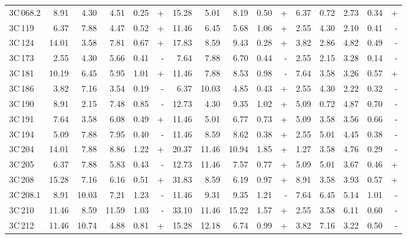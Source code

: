 \documentclass[mathleft,fleqn,%
]{an}
\begin{document}
\begin{table*}
\begin{tabular}{l|rrrrr|rrrrr|rrrrr}
   3C\,068.2 &   8.91 &   4.30 &   4.51 &   0.25 & +  &  15.28 &   5.01 &   8.19 &   0.50 & +  &   6.37 &   0.72 &   2.73 &   0.34 & +   \\
     3C\,119 &   6.37 &   7.88 &   4.47 &   0.52 & +  &  11.46 &   6.45 &   5.68 &   1.06 & +  &   2.55 &   4.30 &   2.10 &   0.41 & -   \\
     3C\,124 &  14.01 &   3.58 &   7.81 &   0.67 & +  &  17.83 &   8.59 &   9.43 &   0.28 & +  &   3.82 &   2.86 &   4.82 &   0.49 & -   \\
     3C\,173 &   2.55 &   4.30 &   5.66 &   0.41 & -  &   7.64 &   7.88 &   6.70 &   0.44 & -  &   2.55 &   2.15 &   3.28 &   0.14 & -   \\
     3C\,181 &  10.19 &   6.45 &   5.95 &   1.01 & +  &  11.46 &   7.88 &   8.53 &   0.98 & -  &   7.64 &   3.58 &   3.26 &   0.57 & +   \\
     3C\,186 &   3.82 &   7.16 &   3.54 &   0.19 & -  &   6.37 &  10.03 &   4.85 &   0.43 & +  &   2.55 &   4.30 &   2.22 &   0.32 & -   \\
     3C\,190 &   8.91 &   2.15 &   7.48 &   0.85 & -  &  12.73 &   4.30 &   9.35 &   1.02 & +  &   5.09 &   0.72 &   4.87 &   0.70 & -   \\
     3C\,191 &   7.64 &   3.58 &   6.08 &   0.49 & +  &  11.46 &   5.01 &   6.77 &   0.73 & +  &   5.09 &   3.58 &   3.56 &   0.66 & -   \\
     3C\,194 &   5.09 &   7.88 &   7.95 &   0.40 & -  &  11.46 &   8.59 &   8.62 &   0.38 & +  &   2.55 &   5.01 &   4.45 &   0.38 & -   \\
     3C\,204 &  14.01 &   7.88 &   8.86 &   1.22 & +  &  20.37 &  11.46 &  10.94 &   1.85 & +  &   1.27 &   3.58 &   4.76 &   0.29 & -   \\
     3C\,205 &   6.37 &   7.88 &   5.83 &   0.43 & -  &  12.73 &  11.46 &   7.57 &   0.77 & +  &   5.09 &   5.01 &   3.67 &   0.46 & +   \\
     3C\,208 &  15.28 &   7.16 &   6.16 &   0.51 & +  &  31.83 &   8.59 &   6.19 &   0.97 & +  &   8.91 &   3.58 &   3.93 &   0.57 & +   \\
   3C\,208.1 &   8.91 &  10.03 &   7.21 &   1.23 & -  &  11.46 &   9.31 &   9.35 &   1.21 & -  &   7.64 &   6.45 &   5.14 &   1.01 & -   \\
     3C\,210 &  11.46 &   8.59 &  11.59 &   1.03 & -  &  33.10 &  11.46 &  15.22 &   1.57 & +  &   2.55 &   3.58 &   6.11 &   0.60 & -   \\
     3C\,212 &  11.46 &  10.74 &   4.88 &   0.81 & +  &  15.28 &  12.18 &   6.74 &   0.99 & +  &   3.82 &   7.16 &   3.22 &   0.50 & -   \\

\end{tabular}
\end{table*}
\end{document}
